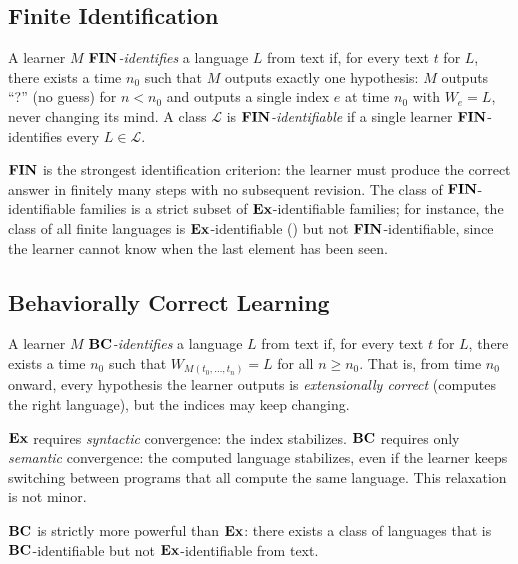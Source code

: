 \subsection{Finite Identification}
\label{sec:fin-learning}

\begin{defn}
\label{def:fin-learning}
A learner $M$ \emph{$\mathbf{FIN}$-identifies} a language $L$ from text if, for every text $t$ for $L$, there exists a time $n_0$ such that $M$ outputs exactly one hypothesis: $M$ outputs ``?'' (no guess) for $n < n_0$ and outputs a single index $e$ at time $n_0$ with $W_e = L$, never changing its mind. A class $\mathcal{L}$ is \emph{$\mathbf{FIN}$-identifiable} if a single learner $\mathbf{FIN}$-identifies every $L \in \mathcal{L}$.
\end{defn}

$\mathbf{FIN}$ is the strongest identification criterion: the learner must produce the correct answer in finitely many steps with no subsequent revision. The class of $\mathbf{FIN}$-identifiable families is a strict subset of $\mathbf{Ex}$-identifiable families; for instance, the class of all finite languages is $\mathbf{Ex}$-identifiable () but not $\mathbf{FIN}$-identifiable, since the learner cannot know when the last element has been seen.

\subsection{Behaviorally Correct Learning}
\label{sec:bc-learning}

\begin{defn}
\label{def:bc-learning}
A learner $M$ \emph{$\mathbf{BC}$-identifies} a language $L$ from text if, for every text $t$ for $L$, there exists a time $n_0$ such that $W_{M(t_0, \ldots, t_n)} = L$ for all $n \geq n_0$. That is, from time $n_0$ onward, every hypothesis the learner outputs is \emph{extensionally correct} (computes the right language), but the indices may keep changing.
\end{defn}

$\mathbf{Ex}$ requires \emph{syntactic} convergence: the index stabilizes. $\mathbf{BC}$ requires only \emph{semantic} convergence: the computed language stabilizes, even if the learner keeps switching between programs that all compute the same language. This relaxation is not minor.

\begin{thm}
\label{thm:bc-strictly-stronger}
$\mathbf{BC}$ is strictly more powerful than $\mathbf{Ex}$: there exists a class of languages that is $\mathbf{BC}$-identifiable but not $\mathbf{Ex}$-identifiable from text.
\end{thm}

